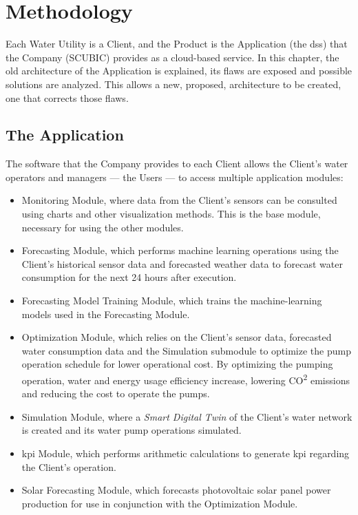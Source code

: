 \chapter{Methodology}\label{methodology}


Each Water Utility is a Client, and the Product is the Application (the \gls{dss}) that the Company (SCUBIC) provides as a cloud-based service. In this chapter, the old architecture of the Application is explained, its flaws are exposed and possible solutions are analyzed. This allows a new, proposed, architecture to be created, one that corrects those flaws.

\section{The Application}\label{methodology:s:the-aplication}

The software that the Company provides to each Client allows the Client's water operators and managers --- the Users --- to access multiple application modules:

\begin{itemize}
    \item Monitoring Module, where data from the Client's sensors can be consulted using charts and other visualization methods. This is the base module, necessary for using the other modules.
    \item Forecasting Module, which performs machine learning operations using the Client's historical sensor data and forecasted weather data to forecast water consumption for the next 24 hours after execution.
    \item Forecasting Model Training Module, which trains the machine-learning models used in the Forecasting Module.
    \item Optimization Module, which relies on the Client's sensor data, forecasted water consumption data and the Simulation submodule to optimize the pump operation schedule for lower operational cost. By optimizing the pumping operation, water and energy usage efficiency increase, lowering CO\textsuperscript{2} emissions and reducing the cost to operate the pumps.
    \item Simulation Module, where a \textit{Smart Digital Twin} of the Client's water network is created and its water pump operations simulated.
    \item \gls{kpi} Module, which performs arithmetic calculations to generate \gls{kpi} regarding the Client's operation.
    \item Solar Forecasting Module, which forecasts photovoltaic solar panel power production for use in conjunction with the Optimization Module.
\end{itemize}  
    
